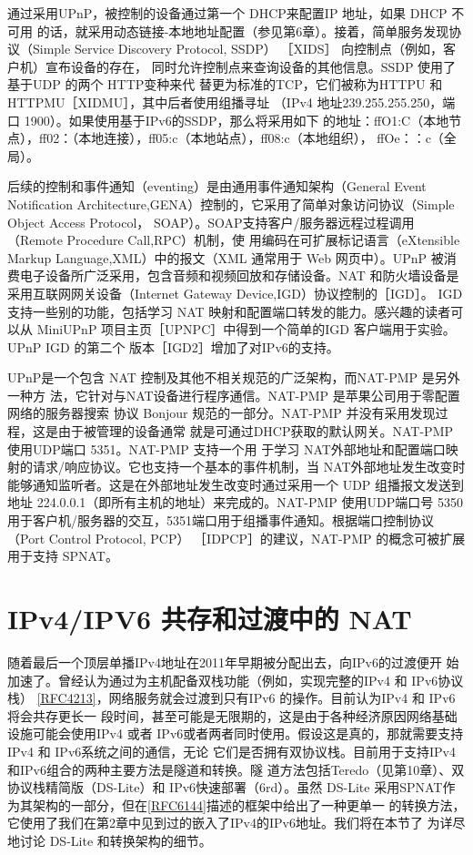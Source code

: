 通过采用UPnP，被控制的设备通过第一个 DHCP来配置IP 地址，如果 DHCP 不可用
的话，就采用动态链接-本地地址配置（参见第6章）。接着，简单服务发现协议（Simple
Service Discovery Protocol, SSDP） ［XIDS］ 向控制点（例如，客户机）宣布设备的存在，
同时允许控制点来查询设备的其他信息。SSDP 使用了基于UDP 的两个 HTTP变种来代
替更为标准的TCP，它们被称为HTTPU 和 HTTPMU［XIDMU］，其中后者使用组播寻址
（IPv4 地址239.255.255.250，端口 1900）。如果使用基于IPv6的SSDP，那么将采用如下
的地址：ffO1:C（本地节点），ff02：（本地连接），ff05:c（本地站点），ff08:c（本地组织），
ffOe：：c（全局）。

后续的控制和事件通知（eventing）是由通用事件通知架构（General Event Notification
Architecture,GENA）控制的，它采用了简单对象访问协议（Simple Object Access Protocol，
SOAP）。SOAP支持客户/服务器远程过程调用（Remote Procedure Call,RPC）机制，使
用编码在可扩展标记语言（eXtensible Markup Language,XML）中的报文（XML 通常用于
Web 网页中）。UPnP 被消费电子设备所广泛采用，包含音频和视频回放和存储设备。NAT
和防火墙设备是采用互联网网关设备（Internet Gateway Device,IGD）协议控制的［IGD］。
IGD 支持一些别的功能，包括学习 NAT 映射和配置端口转发的能力。感兴趣的读者可以从
MiniUPnP 项目主页［UPNPC］中得到一个简单的IGD 客户端用于实验。UPnP IGD 的第二个
版本［IGD2］增加了对IPv6的支持。

UPnP是一个包含 NAT 控制及其他不相关规范的广泛架构，而NAT-PMP 是另外一种方
法，它针对与NAT设备进行程序通信。NAT-PMP 是苹果公司用于零配置网络的服务器搜索
协议 Bonjour 规范的一部分。NAT-PMP 并没有采用发现过程，这是由于被管理的设备通常
就是可通过DHCP获取的默认网关。NAT-PMP 使用UDP端口 5351。NAT-PMP 支持一个用
于学习 NAT外部地址和配置端口映射的请求/响应协议。它也支持一个基本的事件机制，当
NAT外部地址发生改变时能够通知监听者。这是在外部地址发生改变时通过采用一个 UDP
组播报文发送到地址 224.0.0.1（即所有主机的地址）来完成的。NAT-PMP 使用UDP端口号
5350用于客户机/服务器的交互，5351端口用于组播事件通知。根据端口控制协议（Port
Control Protocol, PCP） ［IDPCP］的建议，NAT-PMP 的概念可被扩展用于支持 SPNAT。

\section{IPv4/IPV6 共存和过渡中的 NAT}

随着最后一个顶层单播IPv4地址在2011年早期被分配出去，向IPv6的过渡便开
始加速了。曾经认为通过为主机配备双栈功能（例如，实现完整的IPv4 和 IPv6协议栈）
\href{https://www.rfc-editor.org/rfc/rfc4213}{[RFC4213]}，网络服务就会过渡到只有IPv6
的操作。目前认为IPv4 和 IPv6将会共存更长一
段时间，甚至可能是无限期的，这是由于各种经济原因网络基础设施可能会使用IPv4 或者
IPv6或者两者同时使用。假设这是真的，那就需要支持IPv4 和 IPv6系统之间的通信，无论
它们是否拥有双协议栈。目前用于支持IPv4和IPv6组合的两种主要方法是隧道和转换。隧
道方法包括Teredo（见第10章）、双协议栈精简版（DS-Lite）和 IPv6快速部署（6rd）。虽然
DS-Lite
采用SPNAT作为其架构的一部分，但在\href{https://www.rfc-editor.org/rfc/rfc6144}{[RFC6144]}描述的框架中给出了一种更单一
的转换方法，它使用了我们在第2章中见到过的嵌入了IPv4的IPv6地址。我们将在本节了
为详尽地讨论 DS-Lite 和转换架构的细节。

